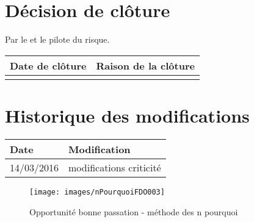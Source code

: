 \section*{Décision de clôture}
Par le \CP{} et le pilote du risque.
\begin{table}[h]
\centering
	\begin{tabularx}{16.8cm}{|X|X|}
	\hline
	\rowcolor{gray!40} Date de clôture & Raison de la clôture \\
	\hline
	  & \\
	\hline
	\end{tabularx}
\end{table}

\section*{Historique des modifications}
\begin{table}[h]
\centering
	\begin{tabularx}{16.8cm}{|X|X|}
	\hline
	\rowcolor{gray!40} Date & Modification \\%
	\hline
	 14/03/2016 & modifications criticité \\
	\hline
	\end{tabularx}
\end{table}
\newpage


\begin{figure}
	\centering
	\texttt{[image: images/nPourquoiFDO003]}
	\caption{\label{opportunite bonne passation}Opportunité bonne passation - méthode des n pourquoi}
\end{figure}
